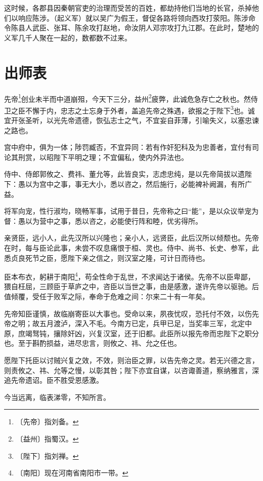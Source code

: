 \documentclass[12pt,UTF-8,openany,a4]{ctexbook}
\begin{document}
\begin{large}
    这时候，各郡县因秦朝官吏的治理而受苦的百姓，都劫持他们当地的长官，杀掉他们以响应陈涉。（起义军）就以吴广为假王，督促各路将领向西攻打荥阳。陈涉命令陈县人武臣、张耳、陈余攻打赵地，命汝阴人邓宗攻打九江郡。在此时，楚地的义军几千人聚在一起的，数都数不过来。
    

\end{large}



\chapter{出师表}

\begin{large}
    
    先帝\footnote{〔先帝〕\yiwen 指刘备。}创业未半而中道崩殂，今天下三分，益州\footnote{〔益州〕\yiwen 指蜀汉。}疲弊，此诚危急存亡之秋也。然侍卫之臣不懈于内，忠志之士忘身于外者，盖追先帝之殊遇，欲报之于陛下\footnote{〔陛下〕\yiwen 指刘禅。}也。诚宜开张圣听，以光先帝遗德，恢弘志士之气，不宜妄自菲薄，引喻失义，以塞忠谏之路也。
    
    宫中府中，俱为一体；陟罚臧否，不宜异同：若有作奸犯科及为忠善者，宜付有司论其刑赏，以昭陛下平明之理；不宜偏私，使内外异法也。
    
    侍中、侍郎郭攸之、费祎、董允等，此皆良实，志虑忠纯，是以先帝简拔以遗陛下：愚以为宫中之事，事无大小，悉以咨之，然后施行，必能裨补阙漏，有所广益。
    
    将军向宠，性行淑均，晓畅军事，试用于昔日，先帝称之曰“能”，是以众议举宠为督：愚以为营中之事，悉以咨之，必能使行阵和睦，优劣得所。
    
    亲贤臣，远小人，此先汉所以兴隆也；亲小人，远贤臣，此后汉所以倾颓也。先帝在时，每与臣论此事，未尝不叹息痛恨于桓、灵也。侍中、尚书、长史、参军，此悉贞良死节之臣，愿陛下亲之信之，则汉室之隆，可计日而待也。
    
    臣本布衣，躬耕于南阳\footnote{〔南阳〕\yiwen 现在河南省南阳市一带。}，苟全性命于乱世，不求闻达于诸侯。先帝不以臣卑鄙，猥自枉屈，三顾臣于草庐之中，咨臣以当世之事，由是感激，遂许先帝以驱驰。后值倾覆，受任于败军之际，奉命于危难之间：尔来二十有一年矣。
    
    先帝知臣谨慎，故临崩寄臣以大事也。受命以来，夙夜忧叹，恐托付不效，以伤先帝之明；故五月渡泸，深入不毛。今南方已定，兵甲已足，当奖率三军，北定中原，庶竭驽钝，攘除奸凶，兴复汉室，还于旧都。此臣所以报先帝而忠陛下之职分也。至于斟酌损益，进尽忠言，则攸之、祎、允之任也。
    
    愿陛下托臣以讨贼兴复之效，不效，则治臣之罪，以告先帝之灵。若无兴德之言，则责攸之、祎、允等之慢，以彰其咎；陛下亦宜自谋，以咨诹善道，察纳雅言，深追先帝遗诏。臣不胜受恩感激。
    
    今当远离，临表涕零，不知所言。

\end{large}
\end{document}
